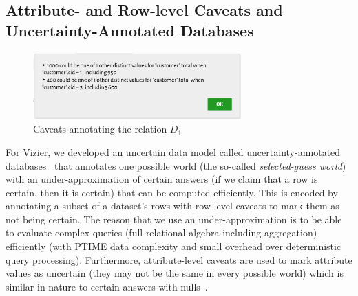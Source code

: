 \subsection{Attribute- and Row-level Caveats and\\ Uncertainty-Annotated Databases}
\label{sec:attribute-row-level}
%
\begin{figure}
  \vspace*{-5mm}
  \centering
  \vspace*{-14mm}
  \includegraphics[width=8cm]{graphics/caveats.png}
  \caption{Caveats annotating the relation $D_1$}
\end{figure}
%


For Vizier, we developed an uncertain data model called
uncertainty-annotated databases~\cite{FH19} that annotates one
possible world (the so-called \textit{selected-guess world}) with an under-approximation  of certain answers (if we claim that a row is certain, then it is certain) that can be computed efficiently. This is encoded by annotating a subset of a dataset's rows with row-level caveats to mark them as not being certain.  The reason that we use an under-approximation is to be able to evaluate complex queries (full relational algebra including aggregation) efficiently (with PTIME data complexity and small overhead over deterministic query processing). Furthermore, attribute-level caveats are used to mark attribute values as uncertain (they may not be the same in every possible world) which is similar in nature to certain answers with nulls~\cite{L16a}.



